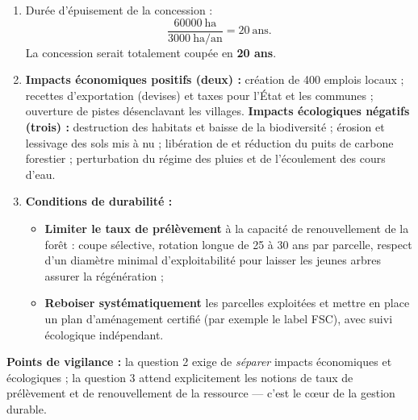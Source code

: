 \documentclass[11pt]{article}
\begin{document}
\begin{corrige}
\begin{enumerate}
\item Durée d'épuisement de la concession :
\[ \frac{\num{60000}\ \text{ha}}{\num{3000}\ \text{ha/an}} = 20\ \text{ans}. \]
La concession serait totalement coupée en \textbf{20 ans}.
\item \textbf{Impacts économiques positifs (deux) :} création de 400 emplois locaux ; recettes d'exportation (devises) et taxes pour l'État et les communes ; ouverture de pistes désenclavant les villages. \textbf{Impacts écologiques négatifs (trois) :} destruction des habitats et baisse de la biodiversité ; érosion et lessivage des sols mis à nu ; libération de  et réduction du puits de carbone forestier ; perturbation du régime des pluies et de l'écoulement des cours d'eau.
\item \textbf{Conditions de durabilité :}
\begin{itemize}
\item \textbf{Limiter le taux de prélèvement} à la capacité de renouvellement de la forêt : coupe sélective, rotation longue de 25 à 30 ans par parcelle, respect d'un diamètre minimal d'exploitabilité pour laisser les jeunes arbres assurer la régénération ;
\item \textbf{Reboiser systématiquement} les parcelles exploitées et mettre en place un plan d'aménagement certifié (par exemple le label FSC), avec suivi écologique indépendant.
\end{itemize}
\end{enumerate}
\textbf{Points de vigilance :} la question 2 exige de \emph{séparer} impacts économiques et écologiques ; la question 3 attend explicitement les notions de taux de prélèvement et de renouvellement de la ressource — c'est le cœur de la gestion durable.
\end{corrige}
\end{document}

